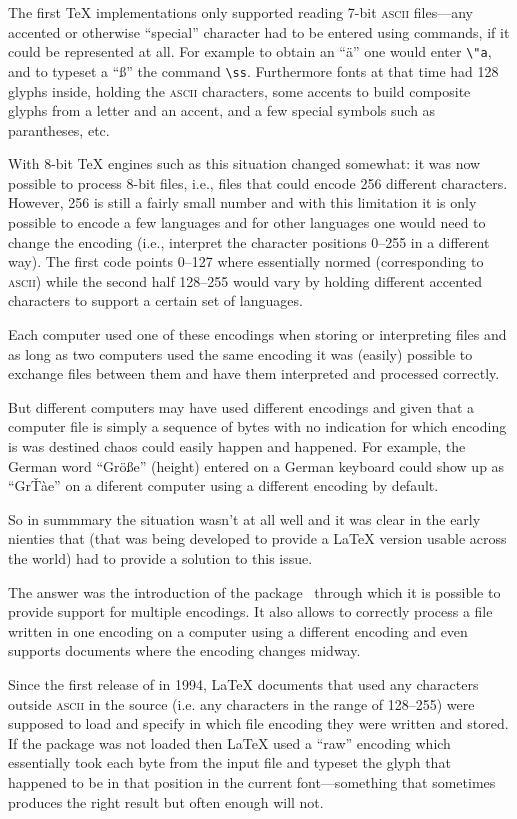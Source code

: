 \documentclass{ltnews}
\providecommand\acro[1]{\textsc{#1}}
\begin{document}
The first \TeX{} implementations only supported reading 7-bit
\acro{ascii} files---any accented or otherwise ``special'' character
had to be entered using commands, if it could be represented at
all. For example to obtain an ``\"a'' one would enter \verb=\"a=, and to
typeset a ``\ss'' the command \verb=\ss=. Furthermore fonts at that
time had 128 glyphs inside, holding the \acro{ascii} characters, some
accents to build composite glyphs from a letter and an accent, and a
few special symbols such as parantheses, etc.

With 8-bit \TeX{} engines such as  this situation changed
somewhat: it was now possible to process 8-bit files, i.e., files that
could encode 256 different characters. However, 256 is still a fairly
small number and with this limitation it is only possible to encode a
few languages and for other languages one would need to change the
encoding (i.e., interpret the character positions 0--255 in a
different way). The first code points 0--127 where essentially normed
(corresponding to \acro{ascii}) while the second half 128--255 would
vary by holding different accented characters to support a certain set
of languages.

Each computer used one of these encodings when storing or interpreting
files and as long as two computers used the same encoding it was
(easily) possible to exchange files between them and have them
interpreted and processed correctly.

But different computers may have used different encodings and given
that a computer file is simply a sequence of bytes with no indication for
which encoding is was destined chaos could easily happen and
happened. For example, the German word ``Gr\"o\ss e'' (height) entered on a
German keyboard could show up as ``Gr\v T\`ae'' on a diferent
computer using a different encoding by default.

So in summmary the situation wasn't at all well and it was clear in
the early nienties that \LaTeXe{} (that was being developed to provide
a \LaTeX{} version usable across the world) had to provide a solution
to this issue.

The \LaTeXe{} answer was the introduction of the 
package~\cite{Mittelbach:Brno95} through which it is possible to
provide support for multiple encodings. It also allows to correctly
process a file written in one encoding on a computer using a different
encoding and even supports documents where the encoding changes
midway.

Since the first release of \LaTeXe{} in 1994, \LaTeX{} documents that
used any characters outside \acro{ascii} in the source (i.e. any
characters in the range of 128--255) were supposed to load
 and specify in which file encoding they were
written and stored.
%
If the  package was not loaded then \LaTeX{} used a
``raw'' encoding which essentially took each byte from the input file
and typeset the glyph that happened to be in that position in the
current font---something that sometimes produces the right result but
often enough will not.
\end{document}
